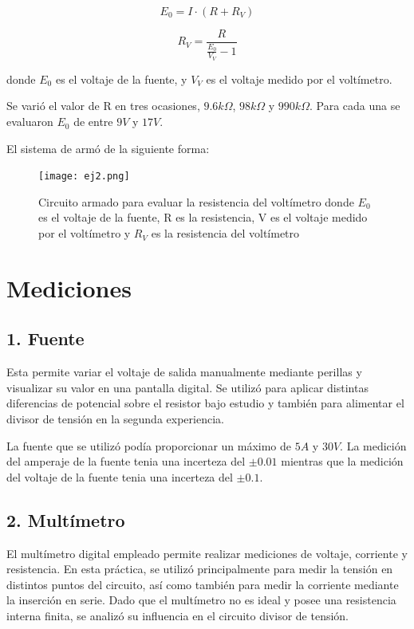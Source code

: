 \documentclass[11pt]{article}
\begin{document}
\begin{equation*}
    E_0 = I \cdot (R + R_V)
\end{equation*}

\begin{equation}
    R_V = \frac{R}{\frac{E_0}{V_V} - 1}
    \label{eq:resistencia-interna}
\end{equation}

donde $E_0$ es el voltaje de la fuente, y $V_V$ es el voltaje medido por el voltímetro.

Se varió el valor de R en tres ocasiones, $9.6k\Omega$, $98k\Omega$ y $990k\Omega$. Para cada una se evaluaron $E_0$ de entre $9V$ y $17V$.

El sistema de armó de la siguiente forma:

\begin{figure}[H]
    \centering
    \texttt{[image: ej2.png]}
    \caption{Circuito armado para evaluar la resistencia del voltímetro donde $E_0$ es el voltaje de la fuente, R es la resistencia, V es el voltaje medido por el voltímetro y $R_V$ es la resistencia del voltímetro}
    \label{fig:ej2}
\end{figure}

\section*{Mediciones}

\subsection*{1. Fuente}

Esta permite variar el voltaje de salida manualmente mediante perillas y visualizar su valor en una pantalla digital. Se utilizó para aplicar distintas diferencias de potencial sobre el resistor bajo estudio y también para alimentar el divisor de tensión en la segunda experiencia.

La fuente que se utilizó podía proporcionar un máximo de $5A$ y $30V$. La medición del amperaje de la fuente tenia una incerteza del $\pm 0.01$ mientras que la medición del voltaje de la fuente tenia una incerteza del $\pm 0.1$.

\subsection*{2. Multímetro}

El multímetro digital empleado permite realizar mediciones de voltaje, corriente y resistencia. En esta práctica, se utilizó principalmente para medir la tensión en distintos puntos del circuito, así como también para medir la corriente mediante la inserción en serie. Dado que el multímetro no es ideal y posee una resistencia interna finita, se analizó su influencia en el circuito divisor de tensión.
\end{document}
